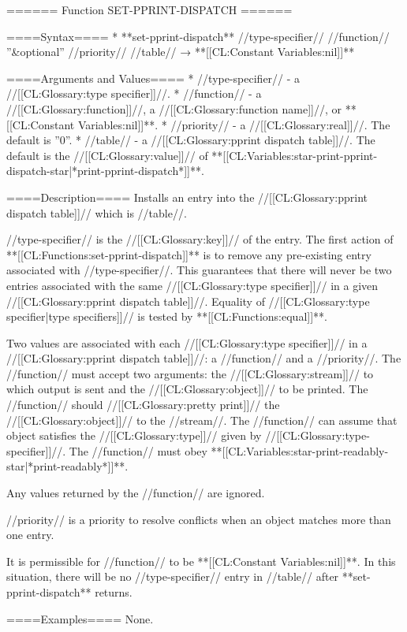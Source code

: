 ====== Function SET-PPRINT-DISPATCH ======

====Syntax====
  * **set-pprint-dispatch** //type-specifier// //function// ''&optional'' //priority// //table// → **[[CL:Constant Variables:nil]]**

====Arguments and Values====
  * //type-specifier// - a //[[CL:Glossary:type specifier]]//.
  * //function// - a //[[CL:Glossary:function]]//, a //[[CL:Glossary:function name]]//, or **[[CL:Constant Variables:nil]]**.
  * //priority// - a //[[CL:Glossary:real]]//. The default is ''0''.
  * //table// - a //[[CL:Glossary:pprint dispatch table]]//. The default is the //[[CL:Glossary:value]]// of **[[CL:Variables:star-print-pprint-dispatch-star|*print-pprint-dispatch*]]**.

====Description====
Installs an entry into the //[[CL:Glossary:pprint dispatch table]]// which is //table//.

//type-specifier// is the //[[CL:Glossary:key]]// of the entry. The first action of **[[CL:Functions:set-pprint-dispatch]]** is to remove any pre-existing entry associated with //type-specifier//. This guarantees that there will never be two entries associated with the same //[[CL:Glossary:type specifier]]// in a given //[[CL:Glossary:pprint dispatch table]]//. Equality of //[[CL:Glossary:type specifier|type specifiers]]// is tested by **[[CL:Functions:equal]]**.

Two values are associated with each //[[CL:Glossary:type specifier]]// in a //[[CL:Glossary:pprint dispatch table]]//: a //function// and a //priority//. The //function// must accept two arguments: the //[[CL:Glossary:stream]]// to which output is sent and the //[[CL:Glossary:object]]// to be printed. The //function// should //[[CL:Glossary:pretty print]]// the //[[CL:Glossary:object]]// to the //stream//. The //function// can assume that object satisfies the //[[CL:Glossary:type]]// given by //[[CL:Glossary:type-specifier]]//. The //function// must obey **[[CL:Variables:star-print-readably-star|*print-readably*]]**.

Any values returned by the //function// are ignored.

//priority// is a priority to resolve conflicts when an object matches more than one entry.

It is permissible for //function// to be **[[CL:Constant Variables:nil]]**. In this situation, there will be no //type-specifier// entry in //table// after **set-pprint-dispatch** returns.

====Examples====
None.

